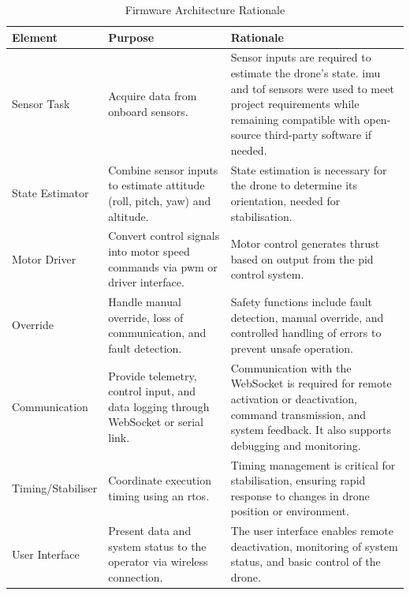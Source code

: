 \begin{table}[H]
\centering
\caption{Firmware Architecture Rationale}
\renewcommand{\arraystretch}{1.2}
\begin{tabular}{|p{}|p{}|p{}|}
\hline
\rowcolor{gray!15}
\textbf{Element} & \textbf{Purpose} & \textbf{Rationale} \\
\hline
Sensor Task & Acquire data from onboard sensors. & Sensor inputs are required to estimate the drone’s state. \gls{imu} and \gls{tof} sensors were used to meet project requirements while remaining compatible with open-source third-party software if needed. \\
\hline
State Estimator & Combine sensor inputs to estimate attitude (roll, pitch, yaw) and altitude. & State estimation is necessary for the drone to determine its orientation, needed for stabilisation. \\
\hline
Motor Driver & Convert control signals into motor speed commands via \gls{pwm} or driver interface. & Motor control generates thrust based on output from the \gls{pid} control system. \\
\hline
Override & Handle manual override, loss of communication, and fault detection. & Safety functions include fault detection, manual override, and controlled handling of errors to prevent unsafe operation. \\
\hline
Communication & Provide telemetry, control input, and data logging through WebSocket or serial link. & Communication with the WebSocket is required for remote activation or deactivation, command transmission, and system feedback. It also supports debugging and monitoring. \\
\hline
Timing/Stabiliser & Coordinate execution timing using an \gls{rtos}. & Timing management is critical for stabilisation, ensuring rapid response to changes in drone position or environment. \\
\hline
User Interface & Present data and system status to the operator via wireless connection. & The user interface enables remote deactivation, monitoring of system status, and basic control of the drone. \\
\hline
\end{tabular}
\end{table}